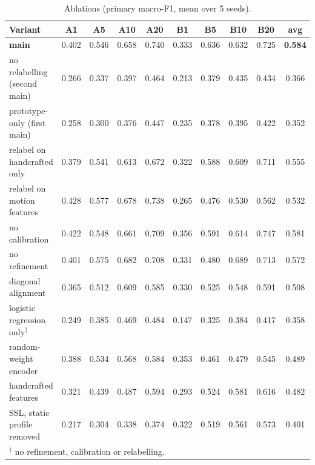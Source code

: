 \documentclass[11pt,a4paper]{article}
\begin{document}
\begin{table}[H]
\centering\footnotesize\setlength{\tabcolsep}{4pt}
\caption{Ablations (primary macro-F1, mean over 5 seeds).}
\label{tab:abl}
\begin{tabular}{@{}l*{9}{c}@{}}
\toprule
Variant & A1 & A5 & A10 & A20 & B1 & B5 & B10 & B20 & avg\\
\midrule
\textbf{main} & 0.402 & 0.546 & 0.658 & 0.740 & 0.333 & 0.636 & 0.632 & 0.725 & \textbf{0.584}\\
no relabelling (second main) & 0.266 & 0.337 & 0.397 & 0.464 & 0.213 & 0.379 & 0.435 & 0.434 & 0.366\\
prototype-only (first main) & 0.258 & 0.300 & 0.376 & 0.447 & 0.235 & 0.378 & 0.395 & 0.422 & 0.352\\
relabel on handcrafted only & 0.379 & 0.541 & 0.613 & 0.672 & 0.322 & 0.588 & 0.609 & 0.711 & 0.555\\
relabel on motion features & 0.428 & 0.577 & 0.678 & 0.738 & 0.265 & 0.476 & 0.530 & 0.562 & 0.532\\
no calibration & 0.422 & 0.548 & 0.661 & 0.709 & 0.356 & 0.591 & 0.614 & 0.747 & 0.581\\
no refinement & 0.401 & 0.575 & 0.682 & 0.708 & 0.331 & 0.480 & 0.689 & 0.713 & 0.572\\
diagonal alignment & 0.365 & 0.512 & 0.609 & 0.585 & 0.330 & 0.525 & 0.548 & 0.591 & 0.508\\
logistic regression only$^\dagger$ & 0.249 & 0.385 & 0.469 & 0.484 & 0.147 & 0.325 & 0.384 & 0.417 & 0.358\\
random-weight encoder & 0.388 & 0.534 & 0.568 & 0.584 & 0.353 & 0.461 & 0.479 & 0.545 & 0.489\\
handcrafted features & 0.321 & 0.439 & 0.487 & 0.594 & 0.293 & 0.524 & 0.581 & 0.616 & 0.482\\
SSL, static profile removed & 0.217 & 0.304 & 0.338 & 0.374 & 0.322 & 0.519 & 0.561 & 0.573 & 0.401\\
\bottomrule
\multicolumn{10}{l}{\footnotesize $^\dagger$ no refinement, calibration or relabelling.}
\end{tabular}
\end{table}
\end{document}
